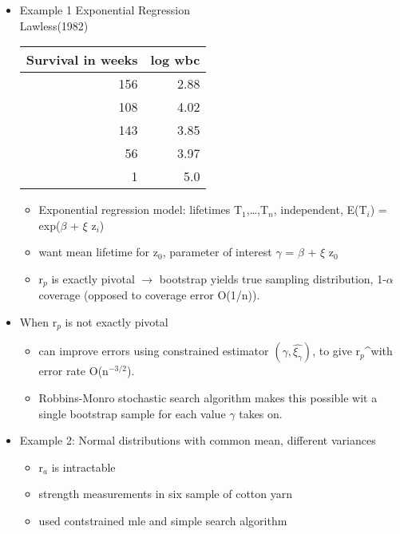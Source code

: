 \documentclass[bigger]{beamer}
\begin{document}
\begin{itemize}

\item Example 1 Exponential Regression\\
\label{sec-1-3-1}%
Lawless(1982)


\begin{center}
\begin{tabular}{rr}
 Survival in weeks  &  log wbc  \\
\hline
               156  &     2.88  \\
               108  &     4.02  \\
               143  &     3.85  \\
                56  &     3.97  \\
                 1  &      5.0  \\
\hline
\end{tabular}
\end{center}



\begin{itemize}
\item Exponential regression model: lifetimes T$_1$,\ldots,T$_n$,
  independent, E(T$_i$) = exp($\beta$ + $\xi$ z$_i$)
\item want mean lifetime for z$_0$, parameter of interest $\gamma$ = $\beta$ +
  $\xi$ z$_0$
\item r$_p$ is exactly pivotal $\rightarrow$ bootstrap yields true sampling
  distribution, 1-$\alpha$ coverage (opposed to coverage error O(1/n)).
\end{itemize}


\item When r$_p$ is not exactly pivotal
\label{sec-1-3-2}%
\begin{itemize}
\item can improve errors using constrained estimator
   $(\gamma,\hat{\xi_\gamma})$, to give r$_p$^\dag with error rate
   O(n$^{\mathrm{-3/2}}$).
\item Robbins-Monro stochastic search algorithm makes this possible
  wit a single bootstrap sample for each value $\gamma$ takes on.
\end{itemize}


\item Example 2: Normal distributions with common mean, different variances\\
\label{sec-1-3-3}%
\begin{itemize}
\item r$_a$ is intractable
\item strength measurements in six sample of cotton yarn
\item used contstrained mle and simple search algorithm
\end{itemize}

\end{itemize} %
\end{document}
